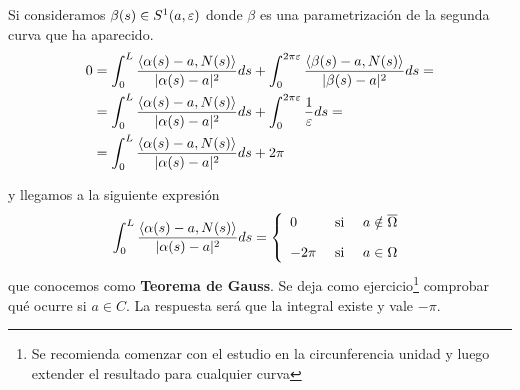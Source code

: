 \begin{observacion}
\begin{enumerate}[start=4]
\begin{enumerate}
            \begin{figure}[H]
                \centering
            \end{figure}
            Si consideramos $\beta(s)\in S^1(a,\varepsilon)$ donde $\beta$ es una parametrización de la segunda curva que ha aparecido.
            \begin{align*}
                0 &= \int_0^L \frac{\langle \alpha(s)-a, N(s)\rangle}{|\alpha(s)-a|^2} ds +\int_0^{2\pi \varepsilon} \frac{\langle \beta(s)-a, N(s)\rangle}{|\beta(s)-a|^2} ds = \\
                &= \int_0^L \frac{\langle \alpha(s)-a, N(s)\rangle}{|\alpha(s)-a|^2} ds +\int_0^{2\pi \varepsilon} \frac{1}{\varepsilon} ds= \\
                &= \int_0^L \frac{\langle \alpha(s)-a, N(s)\rangle}{|\alpha(s)-a|^2} ds + 2 \pi
            \end{align*}
        \end{enumerate}
        y llegamos a la siguiente expresión
        \begin{gather*}
            \int_0^L \frac{\langle \alpha(s)-a, N(s) \rangle}{|\alpha(s)-a|^2} ds = 
            \left\{
                \begin{array}{l c c}
                    0 & \text{ si } & a\notin \overline{\Omega}\\[1em]
                    -2\pi & \text{ si } & a\in \Omega
                \end{array}
            \right.
        \end{gather*}
        que conocemos como \textbf{Teorema de Gauss}. Se deja como ejercicio\footnote{Se recomienda comenzar con el estudio en la circunferencia unidad y luego extender el resultado para cualquier curva} comprobar qué ocurre si $a\in C$. La respuesta será que la integral existe y vale $-\pi$.        


\end{enumerate}
\end{observacion}
